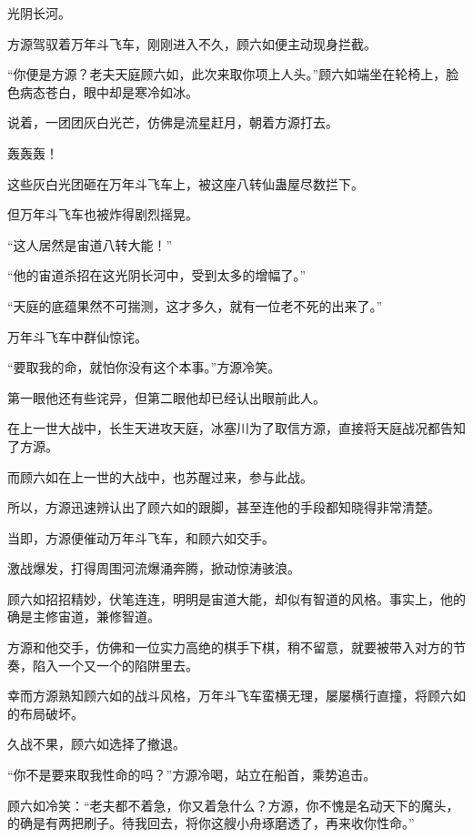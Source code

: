 
\begin{this_body}

光阴长河。

方源驾驭着万年斗飞车，刚刚进入不久，顾六如便主动现身拦截。

“你便是方源？老夫天庭顾六如，此次来取你项上人头。”顾六如端坐在轮椅上，脸色病态苍白，眼中却是寒冷如冰。

说着，一团团灰白光芒，仿佛是流星赶月，朝着方源打去。

轰轰轰！

这些灰白光团砸在万年斗飞车上，被这座八转仙蛊屋尽数拦下。

但万年斗飞车也被炸得剧烈摇晃。

“这人居然是宙道八转大能！”

“他的宙道杀招在这光阴长河中，受到太多的增幅了。”

“天庭的底蕴果然不可揣测，这才多久，就有一位老不死的出来了。”

万年斗飞车中群仙惊诧。

“要取我的命，就怕你没有这个本事。”方源冷笑。

第一眼他还有些诧异，但第二眼他却已经认出眼前此人。

在上一世大战中，长生天进攻天庭，冰塞川为了取信方源，直接将天庭战况都告知了方源。

而顾六如在上一世的大战中，也苏醒过来，参与此战。

所以，方源迅速辨认出了顾六如的跟脚，甚至连他的手段都知晓得非常清楚。

当即，方源便催动万年斗飞车，和顾六如交手。

激战爆发，打得周围河流爆涌奔腾，掀动惊涛骇浪。

顾六如招招精妙，伏笔连连，明明是宙道大能，却似有智道的风格。事实上，他的确是主修宙道，兼修智道。

方源和他交手，仿佛和一位实力高绝的棋手下棋，稍不留意，就要被带入对方的节奏，陷入一个又一个的陷阱里去。

幸而方源熟知顾六如的战斗风格，万年斗飞车蛮横无理，屡屡横行直撞，将顾六如的布局破坏。

久战不果，顾六如选择了撤退。

“你不是要来取我性命的吗？”方源冷喝，站立在船首，乘势追击。

顾六如冷笑：“老夫都不着急，你又着急什么？方源，你不愧是名动天下的魔头，的确是有两把刷子。待我回去，将你这艘小舟琢磨透了，再来收你性命。”


\end{this_body}

